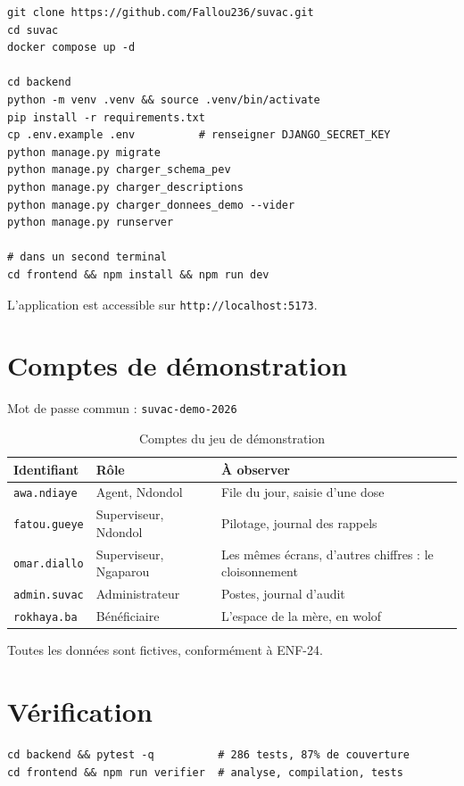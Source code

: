 \documentclass[11pt,a4paper]{report}
\begin{document}
\begin{lstlisting}
git clone https://github.com/Fallou236/suvac.git
cd suvac
docker compose up -d

cd backend
python -m venv .venv && source .venv/bin/activate
pip install -r requirements.txt
cp .env.example .env          # renseigner DJANGO_SECRET_KEY
python manage.py migrate
python manage.py charger_schema_pev
python manage.py charger_descriptions
python manage.py charger_donnees_demo --vider
python manage.py runserver

# dans un second terminal
cd frontend && npm install && npm run dev
\end{lstlisting}

L'application est accessible sur \texttt{http://localhost:5173}.

\section{Comptes de démonstration}

Mot de passe commun : \texttt{suvac-demo-2026}

\begin{table}[H]
\centering
\begin{tabularx}{\textwidth}{@{}llX@{}}
\toprule
\textbf{Identifiant} & \textbf{Rôle} & \textbf{À observer} \\
\midrule
\texttt{awa.ndiaye} & Agent, Ndondol & File du jour, saisie d'une dose \\
\texttt{fatou.gueye} & Superviseur, Ndondol & Pilotage, journal des rappels \\
\texttt{omar.diallo} & Superviseur, Ngaparou & Les mêmes écrans, d'autres
chiffres : le cloisonnement \\
\texttt{admin.suvac} & Administrateur & Postes, journal d'audit \\
\texttt{rokhaya.ba} & Bénéficiaire & L'espace de la mère, en wolof \\
\bottomrule
\end{tabularx}
\caption{Comptes du jeu de démonstration}
\end{table}

Toutes les données sont fictives, conformément à ENF-24.

\section{Vérification}

\begin{lstlisting}
cd backend && pytest -q          # 286 tests, 87% de couverture
cd frontend && npm run verifier  # analyse, compilation, tests
\end{lstlisting}
\end{document}
